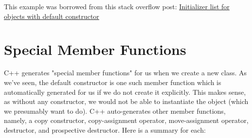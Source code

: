\documentclass{article}
\begin{document}
This example was borrowed from this stack overflow post:
\href{https://stackoverflow.com/questions/13238234/initializer-list-for-objects-with-default-constructor}{%
Initializer list for objects with default constructor}

\section{Special Member Functions}

C++ generates "special member functions" for us when we create a new class. As we've seen, the default
constructor is one such member function which is automatically generated for us if we do not create it
explicitly. This makes sense, as without any constructor, we would not be able to instantiate the object
(which we presumably want to do). C++ auto-generates other member functions, namely, a copy constructor,
copy-assignment operator, move-assignment operator, destructor, and prospective destructor. Here is a summary
for each:
\end{document}
